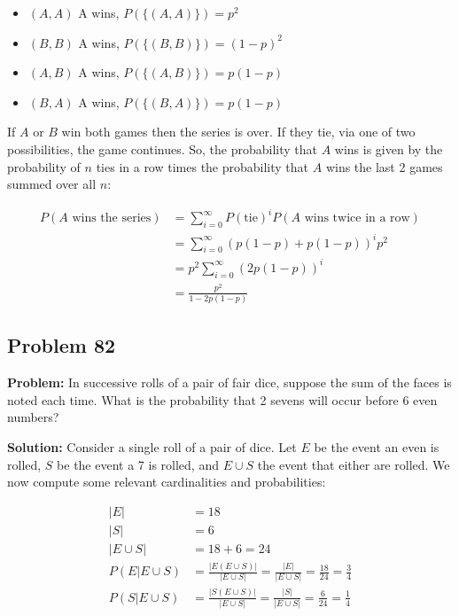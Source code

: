 \documentclass{article}
\begin{document}
\begin{itemize}
    \item $(A,A)$ A wins, $P(\{(A,A)\})=p^2$
    \item $(B,B)$ A wins, $P(\{(B,B)\})=(1-p)^2$
    \item $(A,B)$ A wins, $P(\{(A,B)\})=p(1-p)$
    \item $(B,A)$ A wins, $P(\{(B,A)\})=p(1-p)$
\end{itemize}

If $A$ or $B$ win both games then the series is over. If they tie, via one of two possibilities, the game continues. So, the probability that $A$ wins is given by the probability of $n$ ties in a row times the probability that $A$ wins the last 2 games summed over all $n$:

\begin{align*}
    P(A\text{ wins the series})&=\sum_{i=0}^\infty P(\text{tie})^iP(A\text{ wins twice in a row})\\
    &=\sum_{i=0}^\infty (p(1-p)+p(1-p))^ip^2\tag{independence}\\
    &=p^2\sum_{i=0}^\infty (2p(1-p))^i\tag{algebra}\\
    &=\frac{p^2}{1-2p(1-p)}\tag{geometric series}
\end{align*}

\subsection*{Problem 82}
\noindent\textbf{Problem:} In successive rolls of a pair of fair dice, suppose the sum of the faces is noted each time. What is the probability that 2 sevens will occur before 6 even numbers?
\bigskip

\noindent\textbf{Solution:} Consider a single roll of a pair of dice. Let $E$ be the event an even is rolled, $S$ be the event a 7 is rolled, and $E\cup S$ the event that either are rolled. We now compute some relevant cardinalities and probabilities:

\begin{align*}
    |E|&=18\\
    |S|&=6\\
    |E\cup S|&=18+6=24\tag{$ES=\varnothing$}\\
    P(E|E\cup S)&=\frac{|E(E\cup S)|}{|E\cup S|}=\frac{|E|}{|E\cup S|}=\frac{18}{24}=\frac{3}{4}\tag{$E\subseteq E\cup S$}\\
    P(S|E\cup S)&=\frac{|S(E\cup S)|}{|E\cup S|}=\frac{|S|}{|E\cup S|}=\frac{6}{24}=\frac{1}{4}\tag{$S\subseteq E\cup S$}
\end{align*}
\end{document}
